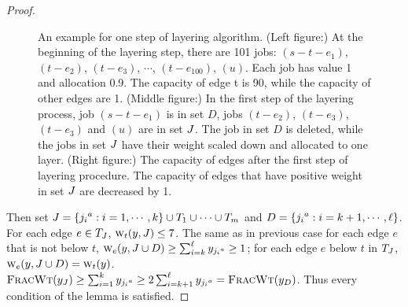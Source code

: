 \begin{proof}
    \begin{figure}[tbp]
    \centering
        \caption{\small{An example for one step of layering
            algorithm. (Left figure:) At the beginning of the layering
            step, there are 101 jobs: $(s-t-e_1)$, $(t-e_2)$,
            $(t-e_3)$, $\cdots$, $(t-e_{100})$, $(u)$. Each job has
            value 1 and allocation 0.9. The capacity of edge t is 90,
            while the capacity of other edges are 1. (Middle figure:)
            In the first step of the layering process, job $(s-t-e_1)$
            is in set $D$, jobs $(t-e_2)$, $(t-e_3)$, $(t-e_3)$ and
            $(u)$ are in set $\tlayer$. The job in set $D$ is deleted,
            while the jobs in set $\tlayer$ have their weight scaled
            down and allocated to one layer. (Right figure:) The
            capacity of edges after the first step of layering
            procedure. The capacity of edges that have positive weight
            in set $\tlayer$ are decreased by 1.}}
    \end{figure}
 
    Then set $\tlayer = \{\armj[j_i] : i = 1, \cdots, k\} \union T_1 \union
    \cdots \union T_m$ and $D = \{\armj[j_i] : i = k+1, \cdots, \ell\}$. For
    each edge $e\in T_\tlayer$, $\fwe(y, \tlayer)\leq 7$. The same as in
    previous case for each edge $e$ that is not below $t$, $\fwe[e](y,
    \tlayer \union
    D)\geq \sum_{i=k}^{\ell}y_{\armj[j_i]}\ge 1$; for each edge $e$ below $t$
    in $T_\tlayer$, $\fwe[e](y, \tlayer \union D)=\fwe(y)$. $\fwt(y_\tlayer) \ge
    \sum_{i=1}^k y_{\armj[j_i]}\ge 2\sum_{i=k+1}^{\ell}
    y_{\armj[j_i]}=\fwt(y_D)$.  Thus every condition of the lemma is satisfied.
\end{proof}

